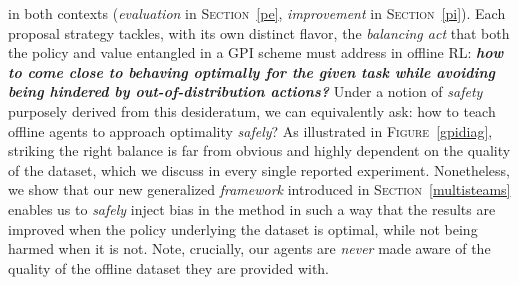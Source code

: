 in both contexts (\emph{evaluation} in \textsc{Section}~\ref{pe}, \emph{improvement} in \textsc{Section}~\ref{pi}).
Each proposal strategy tackles, with its own distinct flavor, the \emph{balancing act} that both the policy
and value entangled in a GPI scheme must address in offline RL:
\textbf{\emph{how to come close to behaving optimally for the given task
while avoiding being hindered by out-of-distribution actions?}}
Under a notion of \emph{safety} purposely derived from this desideratum, we can equivalently ask:
how to teach offline agents to approach optimality \emph{safely}?
As illustrated in \textsc{Figure}~\ref{gpidiag},
striking the right balance is far from obvious and highly dependent on the quality of the
dataset, which we discuss in every single reported experiment.
Nonetheless, we show that our new generalized \emph{framework} introduced in \textsc{Section}~\ref{multisteams}
enables us to \emph{safely} inject bias in the method in such a way that the results are improved when the policy
underlying the dataset is optimal, while not being harmed when it is not.
Note, crucially,
our agents are \emph{never} made aware of the quality of the offline dataset they are provided with.

